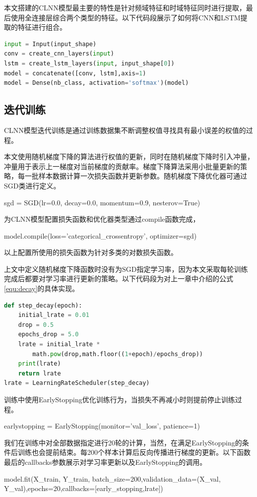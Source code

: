 本文搭建的CLNN模型最主要的特性是针对频域特征和时域特征同时进行提取，最后使用全连接层综合两个类型的特征。以下代码段展示了如何将CNN和LSTM提取的特征进行组合。
\begin{lstlisting}[language={Python},label={lst:concat}]  
input = Input(input_shape)
conv = create_cnn_layers(input)
lstm = create_lstm_layers(input, input_shape[0])
model = concatenate([conv, lstm],axis=1)
model = Dense(nb_class, activation='softmax')(model)
\end{lstlisting}  

\subsection{迭代训练}
CLNN模型迭代训练是通过训练数据集不断调整权值寻找具有最小误差的权值的过程。

本文使用随机梯度下降的算法进行权值的更新，同时在随机梯度下降时引入冲量，冲量用于表示上一梯度对当前梯度的贡献率。梯度下降算法采用小批量更新的策略，每一批样本数据计算一次损失函数并更新参数。随机梯度下降优化器可通过SGD类进行定义。
\begin{center}
sgd = SGD(lr=0.0, decay=0.0, momentum=0.9, nesterov=True)
\end{center}
为CLNN模型配置损失函数和优化器类型通过compile函数完成，
\begin{center}
model.compile(loss='categorical\_crossentropy', optimizer=sgd)
\end{center}
以上配置所使用的损失函数为针对多类的对数损失函数。

上文中定义随机梯度下降函数时没有为SGD指定学习率，因为本文采取每轮训练完成后都要对学习率进行更新的策略。以下代码段为对上一章中介绍的公式\ref{equ:decay}的具体实现。
\begin{lstlisting}[language={Python},label={lst:decay}]  
def step_decay(epoch):
    initial_lrate = 0.01
    drop = 0.5
    epochs_drop = 5.0
    lrate = initial_lrate * 
        math.pow(drop,math.floor((1+epoch)/epochs_drop))
    print(lrate)
    return lrate
lrate = LearningRateScheduler(step_decay)
\end{lstlisting}  

训练中使用EarlyStopping优化训练行为，当损失不再减小时则提前停止训练过程。
\begin{center}
earlystopping = EarlyStopping(monitor='val\_loss', patience=1)
\end{center}

我们在训练中对全部数据指定进行20轮的计算，当然，在满足EarlyStopping的条件后训练也会提前结束。每200个样本计算后反向传播进行梯度的更新。以下函数最后的callbacks参数展示对学习率更新以及EarlyStopping的调用。
\begin{center}
model.fit(X\_train, Y\_train, batch\_size=200,validation\_data=(X\_val, Y\_val),epochs=20,callbacks=[early\_stopping,lrate])
\end{center}


